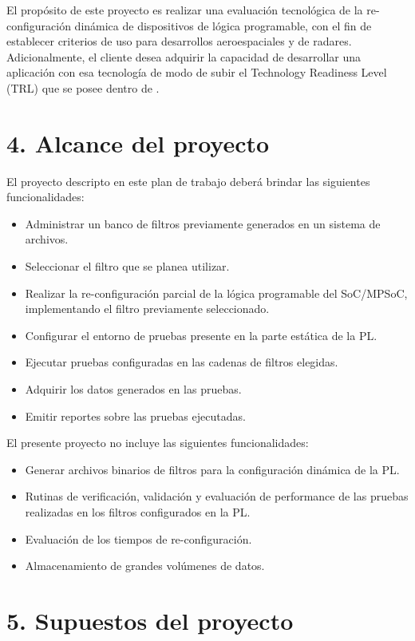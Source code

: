\documentclass[
11pt, %
]{charter}
\begin{document}
El propósito de este proyecto es realizar una evaluación tecnológica de la re-configuración dinámica de dispositivos de lógica programable, con el fin de establecer criterios de uso para desarrollos aeroespaciales y de radares. Adicionalmente, el cliente desea adquirir la capacidad de desarrollar una aplicación con esa tecnología de modo de subir el Technology Readiness Level (TRL) que se posee dentro de \empclientename.

\section{4. Alcance del proyecto}
\label{sec:alcance}

El proyecto descripto en este plan de trabajo deberá brindar las siguientes funcionalidades:

\begin{itemize}
	\item Administrar un banco de filtros previamente generados en un sistema de archivos.
	\item Seleccionar el filtro que se planea utilizar.
	\item Realizar la re-configuración parcial de la lógica programable del SoC/MPSoC, implementando el filtro previamente seleccionado.
	\item Configurar el entorno de pruebas presente en la parte estática de la PL.
	\item Ejecutar pruebas configuradas en las cadenas de filtros elegidas.
	\item Adquirir los datos generados en las pruebas.
	\item Emitir reportes sobre las pruebas ejecutadas.
\end{itemize}

El presente proyecto no incluye las siguientes funcionalidades:
\begin{itemize}
	\item Generar archivos binarios de filtros para la configuración dinámica de la PL.
	\item Rutinas de verificación, validación y evaluación de performance de las pruebas realizadas en los filtros configurados en la PL.
	\item Evaluación de los tiempos de re-configuración.
	\item Almacenamiento de grandes volúmenes de datos.
\end{itemize}

\section{5. Supuestos del proyecto}
\label{sec:supuestos}
\end{document}
